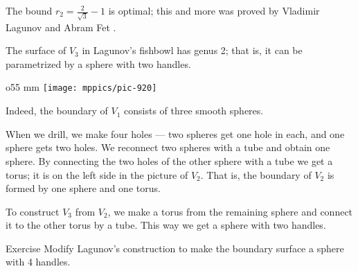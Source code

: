 The bound $r_2=\tfrac2{\sqrt{3}}-1$ is optimal;
this and more was proved by Vladimir Lagunov and Abram Fet \cite{lagunov-1960, lagunov-fet-1963, lagunov-fet-1965}.

The surface of $V_3$ in Lagunov's fishbowl has genus 2;
that is, it can be parametrized by a sphere with two handles.

\begin{wrapfigure}{o}{55 mm}
\centering
\vskip-0mm
\texttt{[image: mppics/pic-920]}
\vskip0mm
\end{wrapfigure}

Indeed, the boundary of $V_1$ consists of three smooth spheres.

When we drill, we make four holes --- two spheres get one hole in each, and one sphere gets two holes.
We reconnect two spheres with a tube and obtain one sphere.
By connecting the two holes of the other sphere with a tube we get a torus;
it is on the left side in the picture of $V_2$.
That is, the boundary of $V_2$ is formed by one sphere and one torus.

To construct $V_3$ from $V_2$, we make a torus from the remaining sphere and connect it to the other torus by a tube.
This way we get a sphere with two handles.

\begin{thm}{Exercise}\label{ex:lagunov-genus4}
Modify Lagunov's construction to make the boundary surface a sphere with 4 handles.
\end{thm}



